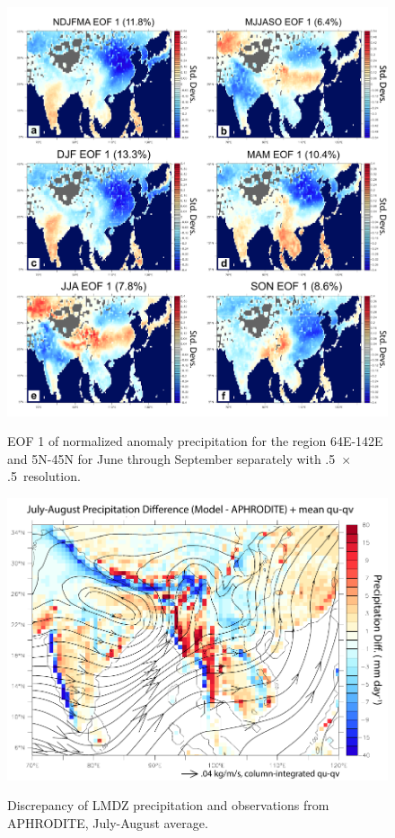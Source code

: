 \documentclass[12pt]{article}
\begin{document}

\begin{figure}[t]
  \noindent\includegraphics[width=36pc,angle=0]{figS1_eof_season}\\
  \caption{EOF 1 of normalized anomaly precipitation for the region 64E-142E and 5N-45N for June through September separately with .5\textdegree\ $\times$ .5\textdegree\ resolution.}\label{f13}
\end{figure}

\begin{figure}[t]
  \noindent\includegraphics[width=36pc,angle=0]{figS2lmdzprecip}\\
  \caption{Discrepancy of LMDZ precipitation and observations from APHRODITE, July-August average.}\label{f14}
\end{figure}
\end{document}
